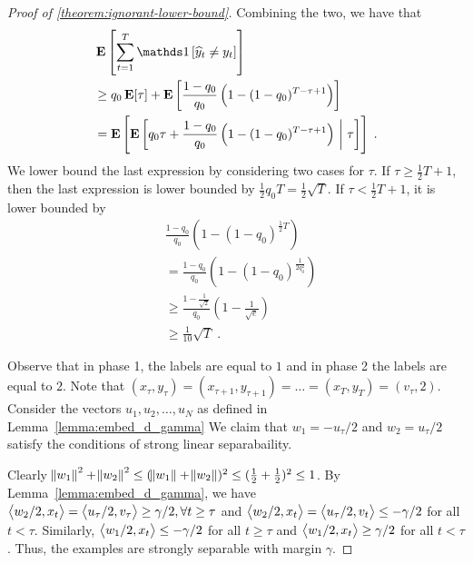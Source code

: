 \begin{proof}[Proof of \autoref{theorem:ignorant-lower-bound}]
Combining the two, we have that
\begin{align*}
& \Exp \left[\sum_{t=1}^T \indicator{\widehat y_t\neq y_t}\right] \nonumber \\
& \ge q_0 \Exp[\tau] + \Exp \left[\frac{1-q_0}{q_0}\left(1-(1-q_0)^{T-\tau+1}\right)\right] \\
& =  \Exp \left[ \Exp \left[ q_0 \tau + \frac{1-q_0}{q_0}\left(1-(1-q_0)^{T-\tau+1}\right) ~\middle|~ \tau \right] \right] \; .
\end{align*}
We lower bound the last expression by considering two cases for $\tau$.
If $\tau \ge \frac{1}{2}T + 1$, then the last expression is lower bounded by
$\frac{1}{2}q_0 T = \frac{1}{2} \sqrt{T}$. If
$\tau < \frac{1}{2}T+1$, it is lower bounded by
\begin{align*}
& \frac{1-q_0}{q_0}\left(1-(1-q_0)^{\frac{1}{2}T}\right) \\
& = \frac{1-q_0}{q_0}\left(1-(1-q_0)^{\frac{1}{2q_0^2}}\right) \\
& \ge \frac{1-\frac{1}{\sqrt{2}}}{q_0}\left(1-\frac{1}{\sqrt{e}}\right) \\
& \ge \frac{1}{10} \sqrt{T} \; .
\end{align*}

Observe that in phase 1, the labels are equal to $1$ and in phase 2 the labels
are equal to $2$. Note that $(x_\tau, y_\tau)=(x_{\tau+1}, y_{\tau+1})= \dots =
(x_T, y_T) = (v_\tau, 2)$. Consider the vectors $u_1, u_2, \dots, u_N$ as
defined in Lemma~\ref{lemma:embed_d_gamma} We claim that $w_1=-u_\tau/2$ and
$w_2=u_\tau/2$ satisfy the conditions of strong linear separabaility.

Clearly $\norm{w_1}^2 + \norm{w_2}^2 \le (\norm{w_1} + \norm{w_2})^2 \le
(\frac{1}{2} + \frac{1}{2})^2 \le 1$. By Lemma~\ref{lemma:embed_d_gamma}, we
have $\left\langle w_2/2, x_t \right\rangle = \left\langle u_\tau/2, v_\tau \right\rangle \ge \gamma/2, \forall t \ge \tau$ and
$\left\langle w_2/2, x_t \right\rangle = \left\langle u_\tau/2, v_t \right\rangle \le - \gamma/2$ for all $t < \tau$. Similarly,
$\left\langle w_1/2, x_t \right\rangle \le -\gamma/2$ for all $t \ge \tau$ and $\left\langle w_1/2, x_t \right\rangle \ge
\gamma/2$ for all $t < \tau$. Thus, the examples are strongly separable with margin
$\gamma$.
\end{proof}
